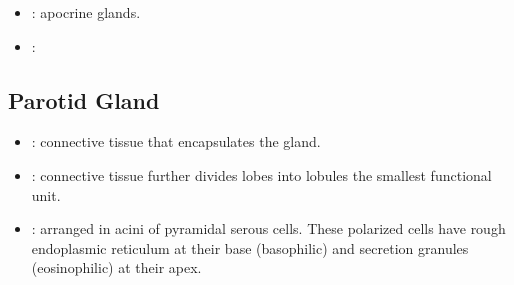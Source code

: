 \begin{itemize}
\begin{multicols}{2}
\begin{itemize}
      \vspace{25pt}

      \begin{center}
      \end{center}

      \item {}: apocrine glands.
      
      \begin{center}
      \end{center}
      
      \item {}: 
      
      \begin{center}
      \end{center}
      
  \end{itemize}
  \end{multicols}

  \subsection{Parotid Gland}\label{Parotid Gland}
  
  
  \begin{multicols}{2}
  \begin{itemize}
    \item {}: connective tissue that encapsulates the gland.
    
    \begin{center}
    \end{center}
    
    \item {}:  connective tissue further divides lobes into lobules the smallest functional unit.
    
    \begin{center}
    \end{center}
    
    \item {}: arranged in acini of pyramidal serous cells. These polarized cells have rough endoplasmic reticulum at their base (basophilic) and secretion granules (eosinophilic) at their apex.
    

\end{itemize}
\end{multicols}
\end{itemize}
